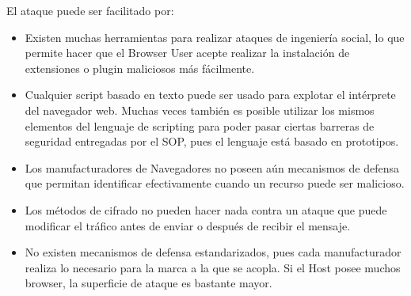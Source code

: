 El ataque puede ser facilitado por:
\begin{itemize}
	\item Existen muchas herramientas para realizar ataques de ingeniería social, lo que permite hacer que el Browser User acepte realizar la instalación de extensiones o plugin maliciosos más fácilmente.
	\item Cualquier script basado en texto puede ser usado para explotar el intérprete del navegador web. Muchas veces también es posible utilizar los mismos elementos del lenguaje de scripting para poder pasar ciertas barreras de seguridad entregadas por el SOP, pues el lenguaje está basado en prototipos. 
	\item Los manufacturadores de Navegadores no poseen aún mecanismos de defensa que permitan identificar efectivamente cuando un recurso puede ser malicioso.
	\item Los métodos de cifrado no pueden hacer nada contra un ataque que puede modificar el tráfico antes de enviar o después de recibir el mensaje.
	\item No existen mecanismos de defensa estandarizados, pues cada manufacturador realiza lo necesario para la marca a la que se acopla. Si el Host posee muchos browser, la superficie de ataque es bastante mayor.
\end{itemize}
